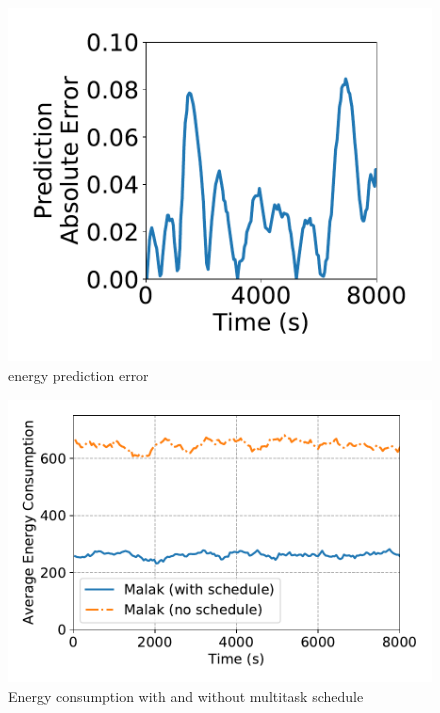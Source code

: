 \begin{figure}[htbp]
	\centering
	\includegraphics[width=.85\columnwidth]{Figure/energy_pred_err}
	\vspace{-0.1in}
	\caption{energy prediction error}
	\label{energy_pred_err}
	\vspace{-0.2in}
\end{figure}
\begin{figure}[htbp]
	\centering
	\includegraphics[width=.85\columnwidth]{Figure/multitask_energy}
	\vspace{-0.1in}
	\caption{Energy consumption with and without multitask schedule}
	\label{throughtput}
	\vspace{-0.2in}
\end{figure}

